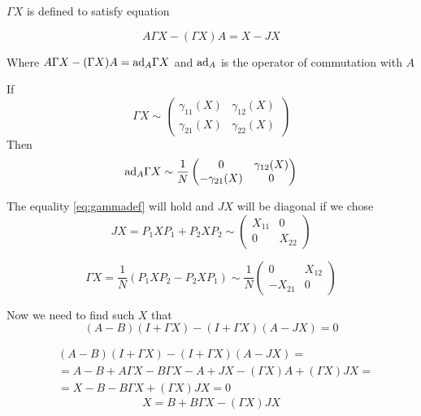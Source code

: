 \documentclass{article}
\begin{document}
\( \Gamma X \) is defined to satisfy equation

\begin{equation}
\label{eq:gammadef}
    A\Gamma X - (\Gamma X) A = X - JX
\end{equation}

Where \( A\Gamma X - (\Gamma X) A = \mathrm{ad}_{A}{\Gamma X} \) and \( \mathrm{ad}_{A}{} \) is the operator of commutation with \( A \)

If
\[
    \Gamma X \sim
    \begin{pmatrix}
        \gamma_{11}(X) & \gamma_{12}(X) \\
        \gamma_{21}(X) & \gamma_{22}(X)
    \end{pmatrix}
    \]
Then
\[
    \mathrm{ad}_{A}{\Gamma X} \sim
    \frac1N
    \begin{pmatrix}
        0 & \gamma_{12}(X) \\
        - \gamma_{21}(X) & 0
    \end{pmatrix}
    \]

The equality \eqref{eq:gammadef} will hold and \( JX \) will be diagonal if we chose
\[
    JX = P_1 X P_1 + P_2 X P_2 \sim
    \begin{pmatrix}
        X_{11} & 0 \\
        0      & X_{22}
    \end{pmatrix}
    \]

\[
    \Gamma X = \frac{1}{N} (P_1 X P_2 - P_2 X P_1) \sim
    \frac{1}{N}
    \begin{pmatrix}
        0       & X_{12} \\
        -X_{21} & 0
    \end{pmatrix}
    \]

Now we need to find such \( X \) that
\begin{equation}\label{eq:similarity1}
    (A - B)(I + \Gamma X) - (I + \Gamma X)(A - JX) = 0
\end{equation}

\[\begin{aligned}
    & (A - B)(I + \Gamma X) - (I + \Gamma X)(A - JX) = \\
    & = A - B + A\Gamma X - B\Gamma X - A + JX - (\Gamma X) A + (\Gamma X) JX = \\
    & = X - B - B\Gamma X + (\Gamma X) JX = 0
\end{aligned}\]
\begin{equation}\label{eq:similarity2}
    X = B + B\Gamma X - (\Gamma X) JX
\end{equation}
\end{document}
